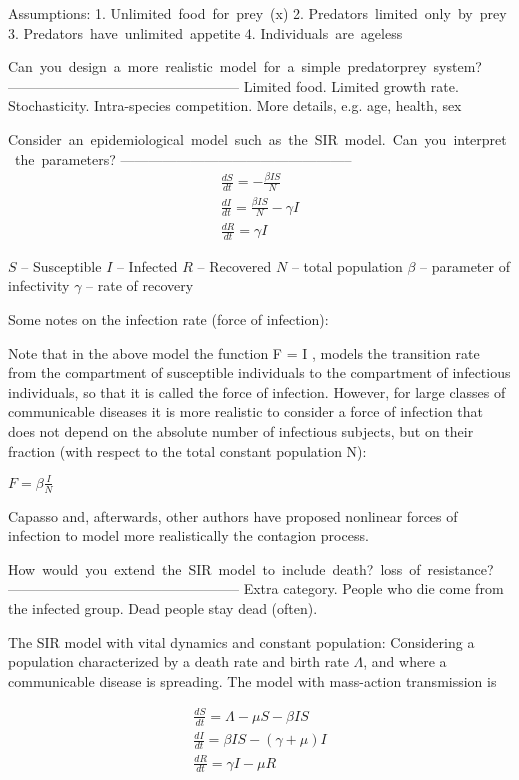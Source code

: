 Assumptions: 
1. Unlimited food for prey (x)
2. Predators limited only by prey
3. Predators have unlimited appetite
4. Individuals are ageless 

Can you design a more realistic model for a simple predator­prey system?
--------------------------------------------------
Limited food. 
Limited growth rate. 
Stochasticity.
Intra-species competition. 
More details, e.g. age, health, sex  

Consider an epidemiological model such as the SIR model. Can you interpret the parameters?
--------------------------------------------------
\begin{align*}
 \frac{dS}{dt} = - \frac{\beta I S}{N}  \\
 \frac{dI}{dt} = \frac{\beta I S}{N}- \gamma I  \\
 \frac{dR}{dt} = \gamma I 
\end{align*}

$S$ -- Susceptible
$I$ -- Infected
$R$ -- Recovered
$N$ -- total population
$\beta$ -- parameter of infectivity
$\gamma$ -- rate of recovery

Some notes on the infection rate (force of infection): 

Note that in the above model the function
F = \beta I ,
models the transition rate from the compartment of susceptible individuals to
the compartment of infectious individuals, so that it is called the force of
infection. However, for large classes of communicable diseases it is more
realistic to consider a force of infection that does not depend on the absolute
number of infectious subjects, but on their fraction (with respect to the total
constant population N):

$F = \beta \frac{I}{N}$

Capasso and, afterwards, other authors have proposed nonlinear forces of
infection to model more realistically the contagion process.

How would you extend the SIR model to include death? loss of resistance?
--------------------------------------------------
Extra category. People who die come from the infected group. Dead people stay
dead (often).  

The SIR model with vital dynamics and constant population:
Considering a population characterized by a death rate \mu and birth rate $\Lambda$,
and where a communicable disease is spreading. The model with mass-action transmission is

\begin{align*}
 \frac{dS}{dt} = \Lambda - \mu S - \beta I S  \\
 \frac{dI}{dt} = \beta I S - (\gamma +\mu ) I \\
 \frac{dR}{dt} = \gamma I  - \mu R 
\end{align*}

